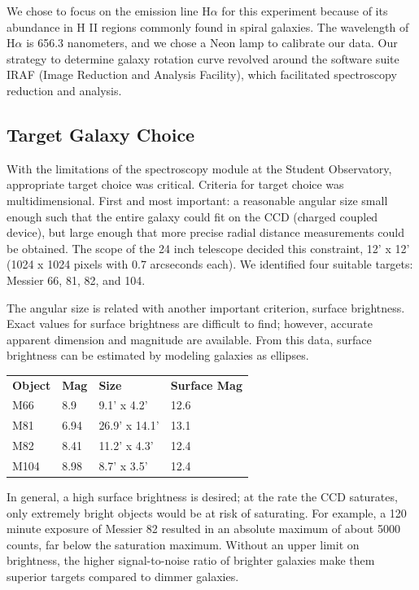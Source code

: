\documentclass[useAMS,usenatbib]{mn2e}
\begin{document}
	We chose to focus on the emission line H$\alpha$ for this experiment because of its abundance in H II regions commonly found in spiral galaxies. The wavelength of H$\alpha$ is 656.3 nanometers, and we chose a Neon lamp to calibrate our data. Our strategy to determine galaxy rotation curve revolved around the software suite IRAF (Image Reduction and Analysis Facility), which facilitated spectroscopy reduction and analysis.
\subsection*{Target Galaxy Choice}

	With the limitations of the spectroscopy module at the Student Observatory, appropriate target choice was critical. Criteria for target choice was multidimensional. First and most important: a reasonable angular size small enough such that the entire galaxy could fit on the CCD (charged coupled device), but large enough that more precise radial distance measurements could be obtained. The scope of the 24 inch telescope decided this constraint, 12' x 12' (1024 x 1024 pixels with 0.7 arcseconds each). We identified four suitable targets: Messier 66, 81, 82, and 104.

	The angular size is related with another important criterion, surface brightness. Exact values for surface brightness are difficult to find; however, accurate apparent dimension and magnitude are available. From this data, surface brightness can be estimated by modeling galaxies as ellipses.
    
\begin{tabular}{llll}
\textbf{Object} & \textbf{Mag} & \textbf{Size} & \textbf{Surface Mag} \\
M66    & 8.9                & 9.1' x 4.2'   & 12.6               \\
M81    & 6.94               & 26.9' x 14.1' & 13.1               \\
M82    & 8.41               & 11.2' x 4.3'  & 12.4               \\
M104   & 8.98               & 8.7' x 3.5'   & 12.4       
\end{tabular}

\vspace{5mm}

 	In general, a high surface brightness is desired; at the rate the CCD saturates, only extremely bright objects would be at risk of saturating. For example, a 120 minute exposure of Messier 82 resulted in an absolute maximum of about 5000 counts, far below the saturation maximum. Without an upper limit on brightness, the higher signal-to-noise ratio of brighter galaxies make them superior targets compared to dimmer galaxies.
    
\end{document}
